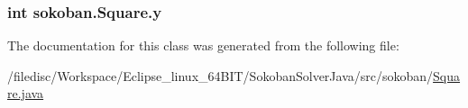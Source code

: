 \hypertarget{classsokoban_1_1Square_8d1877d8d8008844a2eacbc33bd104ca}{
\subsubsection[{y}]{\setlength{\rightskip}{0pt plus 5cm}int {\bf sokoban.Square.y}}}
\label{classsokoban_1_1Square_8d1877d8d8008844a2eacbc33bd104ca}




The documentation for this class was generated from the following file:\begin{CompactItemize}
\item 
/filedisc/Workspace/Eclipse\_\-linux\_\-64BIT/SokobanSolverJava/src/sokoban/\hyperlink{Square_8java}{Square.java}\end{CompactItemize}
